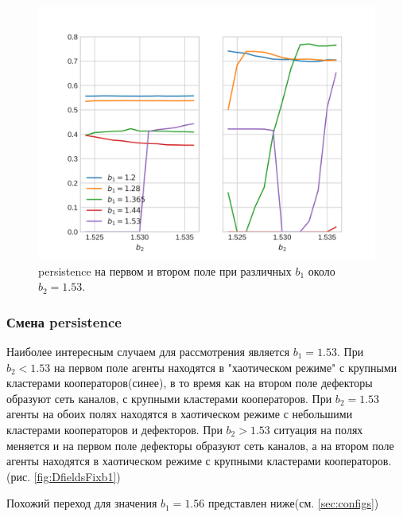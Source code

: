 \documentclass[12pt]{article}
\begin{document}
    \begin{figure}[H]
         \centering
         \includegraphics[width=0.95\columnwidth, keepaspectratio=True]{DoubleField/persistence_at_b_2_153.png}
         \caption{persistence на первом и втором поле при различных $b_1$ около $b_2=1.53$.}
         \label{fig:smallpers}
    \end{figure}

\subsubsection{Смена persistence}
    \label{sec:persistence}
    Наиболее интересным случаем для рассмотрения является $b_1=1.53$. При $b_2 < 1.53$ на первом поле агенты находятся в "хаотическом режиме" с крупными кластерами кооператоров(синее), в то время как на втором поле дефекторы образуют сеть каналов, с крупными кластерами кооператоров. При $b_2=1.53$ агенты на обоих полях находятся в хаотическом режиме с небольшими кластерами кооператоров и дефекторов.
    При $b_2 > 1.53$ ситуация на полях меняется и на первом поле дефекторы образуют сеть каналов, а на втором поле агенты находятся в хаотическом режиме с крупными кластерами кооператоров.(рис. \ref{fig:DfieldsFixb1})
    
    Похожий переход для значения $b_1=1.56$ представлен ниже(см. \ref{sec:configs})
    
\end{document}
